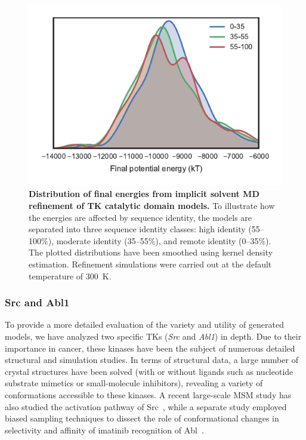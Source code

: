 \documentclass[aps,pre,twocolumn,nofootinbib,superscriptaddress,linenumbers]{revtex4-1}
\begin{document}

\begin{figure}[tbp]
    \includegraphics[width=1.0\columnwidth]{energies/energies.pdf}

    \caption{{\bf Distribution of final energies from implicit solvent MD refinement of TK catalytic domain models.}
    To illustrate how the energies are affected by sequence identity, the models are separated into three sequence identity classes: high identity (55--100\%), moderate identity (35--55\%), and remote identity (0--35\%).
    The plotted distributions have been smoothed using kernel density estimation.
    Refinement simulations were carried out at the default temperature of 300~K.
  }
  \label{figure:energies-implicit}
\end{figure}


\subsubsection*{Src and Abl1}

\color{red}
To provide a more detailed evaluation of the variety and utility of generated models, we have analyzed two specific TKs (\emph{Src} and \emph{Abl1}) in depth.
Due to their importance in cancer, these kinases have been the subject of numerous detailed structural and simulation studies.
In terms of structural data, a large number of crystal structures have been solved (with or without ligands such as nucleotide substrate mimetics or small-molecule inhibitors), revealing a variety of conformations accessible to these kinases.
A recent large-scale MSM study has also studied the activation pathway of Src~\cite{shukla-pande:nature-commun:2014:src-activation-msm}, while a separate study employed biased sampling techniques to dissect the role of conformational changes in selectivity and affinity of imatinib recognition of Abl~\cite{roux:pnas:2013:abl-imatinib}.
\color{black}
\end{document}
